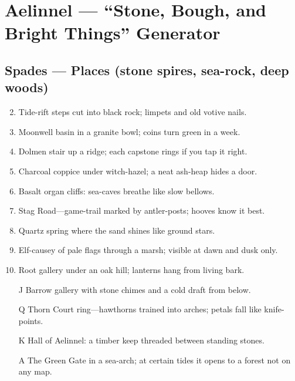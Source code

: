 \chapter{Aelinnel --- ``Stone, Bough, and Bright Things'' Generator}

\section*{Spades --- Places (stone spires, sea-rock, deep woods)}
\begin{enumerate}
\setcounter{enumi}{1}
\item Tide-rift steps cut into black rock; limpets and old votive nails.
\item Moonwell basin in a granite bowl; coins turn green in a week.
\item Dolmen stair up a ridge; each capstone rings if you tap it right.
\item Charcoal coppice under witch-hazel; a neat ash-heap hides a door.
\item Basalt organ cliffs: sea-caves breathe like slow bellows.
\item Stag Road---game-trail marked by antler-posts; hooves know it best.
\item Quartz spring where the sand shines like ground stars.
\item Elf-causey of pale flags through a marsh; visible at dawn and dusk only.
\item Root gallery under an oak hill; lanterns hang from living bark.
\item[J] Barrow gallery with stone chimes and a cold draft from below.
\item[Q] Thorn Court ring---hawthorns trained into arches; petals fall like knife-points.
\item[K] Hall of Aelinnel: a timber keep threaded between standing stones.
\item[A] The Green Gate in a sea-arch; at certain tides it opens to a forest not on any map.
\end{enumerate}

